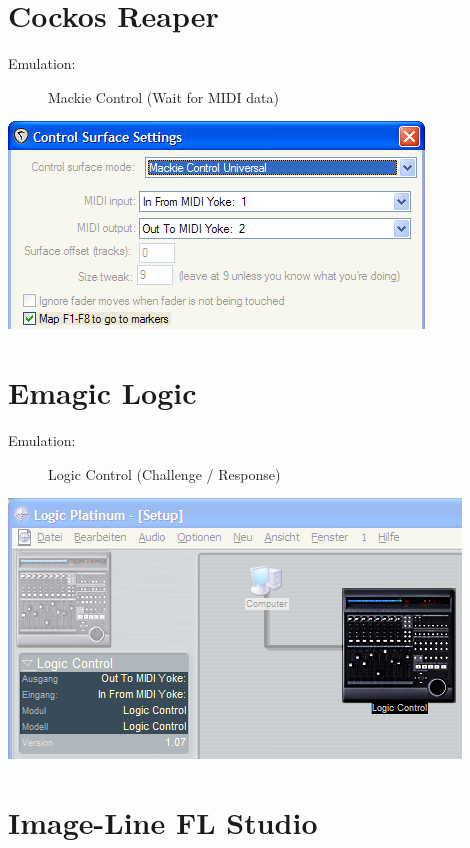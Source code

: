 \section{Cockos Reaper}

\begin{description}
\item[Emulation:] Mackie Control (Wait for MIDI data)
\end{description}

\includegraphics[scale=\screenshotscale,clip]{include/images/reaper_4.png}

\section{Emagic Logic}

\begin{description}
\item[Emulation:] Logic Control (Challenge / Response)
\end{description}

\includegraphics[scale=\screenshotscale,clip]{include/images/logic_5.png}

\section{Image-Line FL Studio}

